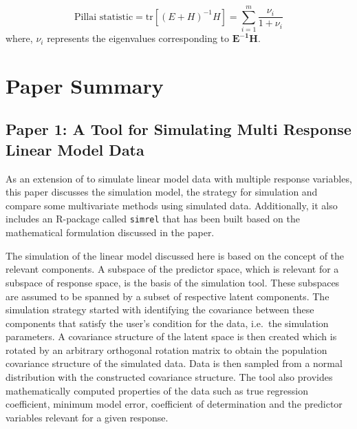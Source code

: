 \documentclass[11pt,twoside,openright,titlepage,
  headinclude,footinclude,BCOR=5mm,
  numbers=noenddot,cleardoublepage=empty,
  tablecaptionabove, dottedtoc,
  bibliography=totoc,paper=a4]{scrreprt}
\begin{document}
\begin{equation}
\text{Pillai statistic} = \text{tr}\left[(E + H)^{-1}H\right] = \sum_{i=1}^{m}{\frac{\nu_i}{1+\nu_i}}
\label{eq:pillai}
\end{equation}
where, \(\nu_i\) represents the eigenvalues corresponding to \(\mathbf{E^{-1}H}\).

\hypertarget{paper-summary}{%
\chapter{Paper Summary}\label{paper-summary}}

\hypertarget{paper-1-a-tool-for-simulating-multi-response-linear-model-data}{%
\section{Paper 1: A Tool for Simulating Multi Response Linear Model Data}\label{paper-1-a-tool-for-simulating-multi-response-linear-model-data}}

As an extension of \citep{saebo2015simrel} to simulate linear model data with multiple response variables, this paper discusses the simulation model, the strategy for simulation and compare some multivariate methods using simulated data. Additionally, it also includes an R-package called \texttt{simrel} that has been built based on the mathematical formulation discussed in the paper.

The simulation of the linear model discussed here is based on the concept of the relevant components. A subspace of the predictor space, which is relevant for a subspace of response space, is the basis of the simulation tool. These subspaces are assumed to be spanned by a subset of respective latent components. The simulation strategy started with identifying the covariance between these components that satisfy the user's condition for the data, i.e.~the simulation parameters. A covariance structure of the latent space is then created which is rotated by an arbitrary orthogonal rotation matrix to obtain the population covariance structure of the simulated data. Data is then sampled from a normal distribution with the constructed covariance structure. The tool also provides mathematically computed properties of the data such as true regression coefficient, minimum model error, coefficient of determination and the predictor variables relevant for a given response.
\end{document}
